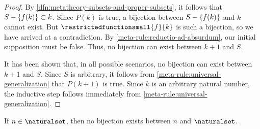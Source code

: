 \begin{proof}
    \vspace{0.2cm}
    \noindent
    By \cref{dfn:metatheory-subsets-and-proper-subsets}, it follows that \( S - \mleft\{ f(k) \mright\} \subset k \).
    Since \( P(k) \) is true, a bijection between \( S - \mleft\{ f(k) \mright\} \) and \( k \) cannot exist.
    But \( \restrictedfunctionsmall{f}{k} \) is such a bijection, so we have arrived at a contradiction.
    By \cref{meta-rule:reductio-ad-absurdum}, our initial supposition must be false.
    Thus, no bijection can exist between \( k + 1 \) and \( S \).

    \vspace{0.3cm}
    \noindent
    It has been shown that, in all possible scenarios, no bijection can exist between \( k + 1 \) and \( S \).
    Since \( S \) is arbitrary, it follows from \cref{meta-rule:universal-generalization} that \( P(k + 1) \) is true.
    Since \( k \) is an arbitrary natural number, the inductive step follows immediately from \cref{meta-rule:universal-generalization}.
\end{proof}

\begin{thm}
     \label{thm:metatheory-no-element-of-N-can-form-bijections-with-N-itself}
    If \( n \in \naturalset \), then no bijection exists between \( n \) and \( \naturalset \).
\end{thm}

